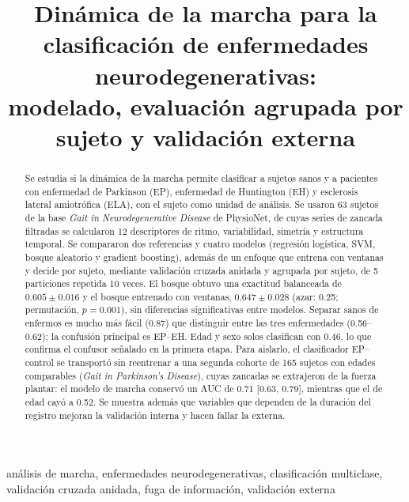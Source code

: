 \documentclass[conference]{IEEEtran}
\begin{document}
\title{Dinámica de la marcha para la clasificación de enfermedades neurodegenerativas:\\modelado, evaluación agrupada por sujeto y validación externa}

\author{
}

\maketitle

\begin{abstract}
Se estudia si la dinámica de la marcha permite clasificar a sujetos sanos y a pacientes con enfermedad de Parkinson (EP), enfermedad de Huntington (EH) y esclerosis lateral amiotrófica (ELA), con el sujeto como unidad de análisis. Se usaron 63 sujetos de la base \textit{Gait in Neurodegenerative Disease} de PhysioNet, de cuyas series de zancada filtradas se calcularon 12 descriptores de ritmo, variabilidad, simetría y estructura temporal. Se compararon dos referencias y cuatro modelos (regresión logística, SVM, bosque aleatorio y gradient boosting), además de un enfoque que entrena con ventanas y decide por sujeto, mediante validación cruzada anidada y agrupada por sujeto, de 5 particiones repetida 10 veces. El bosque obtuvo una exactitud balanceada de $0.605 \pm 0.016$ y el bosque entrenado con ventanas, $0.647 \pm 0.028$ (azar: 0.25; permutación, $p=0.001$), sin diferencias significativas entre modelos. Separar sanos de enfermos es mucho más fácil (0.87) que distinguir entre las tres enfermedades (0.56--0.62); la confusión principal es EP--EH. Edad y sexo solos clasifican con 0.46, lo que confirma el confusor señalado en la primera etapa. Para aislarlo, el clasificador EP--control se transportó sin reentrenar a una segunda cohorte de 165 sujetos con edades comparables (\textit{Gait in Parkinson's Disease}), cuyas zancadas se extrajeron de la fuerza plantar: el modelo de marcha conservó un AUC de 0.71 [0.63, 0.79], mientras que el de edad cayó a 0.52. Se muestra además que variables que dependen de la duración del registro mejoran la validación interna y hacen fallar la externa.
\end{abstract}

\begin{IEEEkeywords}
análisis de marcha, enfermedades neurodegenerativas, clasificación multiclase, validación cruzada anidada, fuga de información, validación externa
\end{IEEEkeywords}
\end{document}
